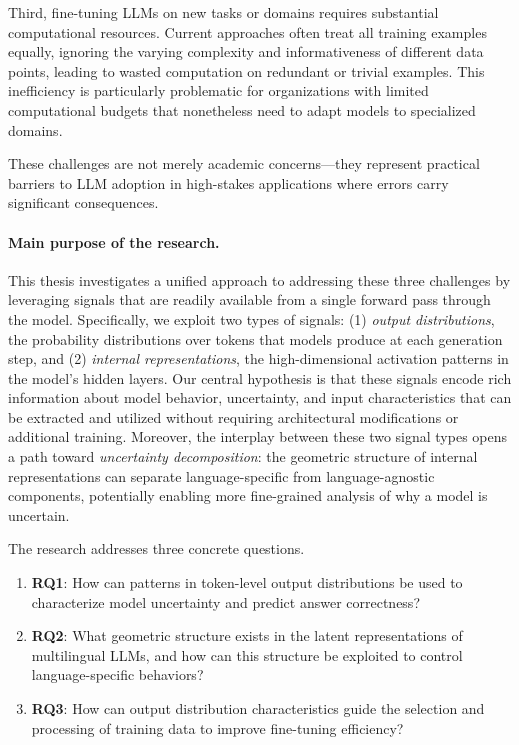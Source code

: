 Third, fine-tuning LLMs on new tasks or domains requires substantial computational resources. Current approaches often treat all training examples equally, ignoring the varying complexity and informativeness of different data points, leading to wasted computation on redundant or trivial examples. This inefficiency is particularly problematic for organizations with limited computational budgets that nonetheless need to adapt models to specialized domains.

These challenges are not merely academic concerns---they represent practical barriers to LLM adoption in high-stakes applications where errors carry significant consequences.

\paragraph{Main purpose of the research.}
This thesis investigates a unified approach to addressing these three challenges by leveraging signals that are readily available from a single forward pass through the model. Specifically, we exploit two types of signals: (1) \textit{output distributions}, the probability distributions over tokens that models produce at each generation step, and (2) \textit{internal representations}, the high-dimensional activation patterns in the model's hidden layers. Our central hypothesis is that these signals encode rich information about model behavior, uncertainty, and input characteristics that can be extracted and utilized without requiring architectural modifications or additional training. Moreover, the interplay between these two signal types opens a path toward \textit{uncertainty decomposition}: the geometric structure of internal representations can separate language-specific from language-agnostic components, potentially enabling more fine-grained analysis of why a model is uncertain.

The research addresses three concrete questions.
\begin{enumerate}
  \item \textbf{RQ1}: How can patterns in token-level output distributions be used to characterize model uncertainty and predict answer correctness?
  \item \textbf{RQ2}: What geometric structure exists in the latent representations of multilingual LLMs, and how can this structure be exploited to control language-specific behaviors?
  \item \textbf{RQ3}: How can output distribution characteristics guide the selection and processing of training data to improve fine-tuning efficiency?
\end{enumerate}

